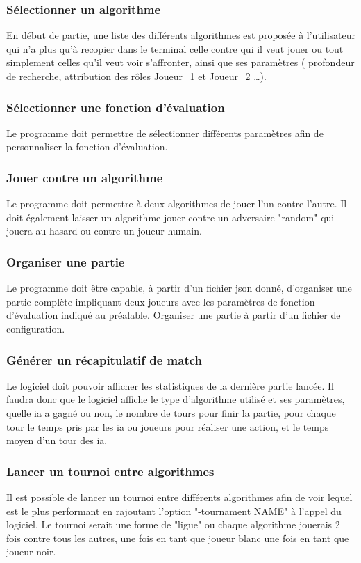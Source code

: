 \huge\documentclass{article}
\begin{document}
    \subsubsection{Sélectionner un algorithme}
    En début de partie, une liste des différents algorithmes est proposée à l'utilisateur qui n'a plus qu'à recopier dans le terminal celle contre qui il veut jouer ou tout simplement celles qu'il veut voir s'affronter, ainsi que ses paramètres ( profondeur de recherche, attribution des rôles Joueur\_1 et Joueur\_2 \dots).
    \medskip
    \subsubsection{Sélectionner une fonction d'évaluation}
    Le programme doit permettre de sélectionner différents paramètres afin de personnaliser la fonction d'évaluation.
    \subsubsection{Jouer contre un algorithme}
    Le programme doit permettre à deux algorithmes de jouer l'un contre l'autre. Il doit également laisser un algorithme jouer contre un adversaire "random" qui jouera au hasard ou contre un joueur humain.
    \subsubsection{Organiser une partie}
    Le programme doit être capable, à partir d'un fichier json donné, d'organiser une partie complète impliquant deux joueurs avec les paramètres de fonction d'évaluation indiqué au préalable.
    Organiser une partie à partir d'un fichier de configuration.
    \subsubsection{Générer un récapitulatif de match}
    Le logiciel doit pouvoir afficher les statistiques de la dernière partie lancée.
    \newline
    Il faudra donc que le logiciel affiche le type d'algorithme utilisé et ses paramètres, quelle ia a gagné ou non, le nombre de tours pour finir la partie, pour chaque tour le temps pris par les ia ou joueurs pour réaliser une action, et le temps moyen d'un tour des ia.
    \medskip
    \subsubsection{Lancer un tournoi entre algorithmes}
    Il est possible de lancer un tournoi entre différents algorithmes afin de voir lequel est le plus performant en rajoutant l'option "-tournament NAME" à l'appel du logiciel.
    Le tournoi serait une forme de "ligue" ou chaque algorithme jouerais 2 fois contre tous les autres, une fois en tant que joueur blanc une fois en tant que joueur noir.
\end{document}
